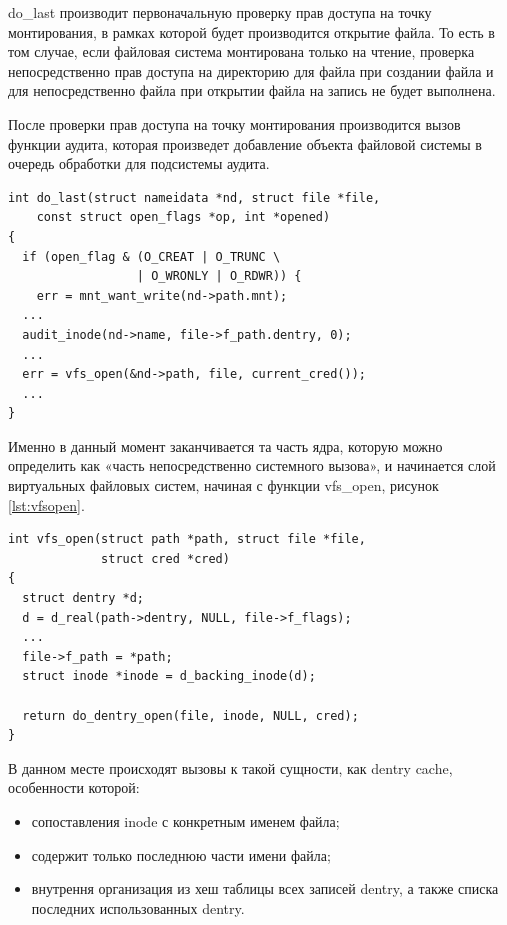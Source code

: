 \documentclass{gost7.32-2001}
\begin{document}
do\_last производит первоначальную проверку прав доступа на точку
монтирования, в рамках которой будет производится открытие файла.
То есть в том случае, если файловая система монтирована только на чтение,
проверка непосредственно прав доступа на директорию для файла при
создании файла и для непосредственно файла при открытии файла на
запись не будет выполнена.

После проверки прав доступа на точку монтирования производится вызов
функции аудита, которая произведет добавление объекта файловой системы
в очередь обработки для подсистемы аудита.

\begin{lstlisting}[caption={Ключевые особенности функции do\_last},
    captionpos=b, float, label={lst:dolast}]
int do_last(struct nameidata *nd, struct file *file,
    const struct open_flags *op, int *opened)
{
  if (open_flag & (O_CREAT | O_TRUNC \
                  | O_WRONLY | O_RDWR)) {
    err = mnt_want_write(nd->path.mnt);
  ...
  audit_inode(nd->name, file->f_path.dentry, 0);
  ...
  err = vfs_open(&nd->path, file, current_cred());
  ...
}
\end{lstlisting}

Именно в данный момент заканчивается та часть ядра, которую можно
определить как «часть непосредственно системного вызова», и начинается
слой виртуальных файловых систем, начиная с функции vfs\_open, рисунок
\ref{lst:vfsopen}.

\begin{lstlisting}[caption={Ключевые особенности функции vfs\_open},
    captionpos=b, float, label={lst:vfsopen}]
int vfs_open(struct path *path, struct file *file,
             struct cred *cred)
{
  struct dentry *d;
  d = d_real(path->dentry, NULL, file->f_flags);
  ...
  file->f_path = *path;
  struct inode *inode = d_backing_inode(d);

  return do_dentry_open(file, inode, NULL, cred);
}
\end{lstlisting}

В данном месте происходят вызовы к такой сущности, как
dentry cache, особенности которой:
\begin{itemize}
\item
  сопоставления inode с конкретным именем файла;
\item
  содержит только последнюю части имени файла;
\item
  внутрення организация из хеш таблицы всех записей dentry, а также
  списка последних использованных dentry.
\end{itemize}
\end{document}
